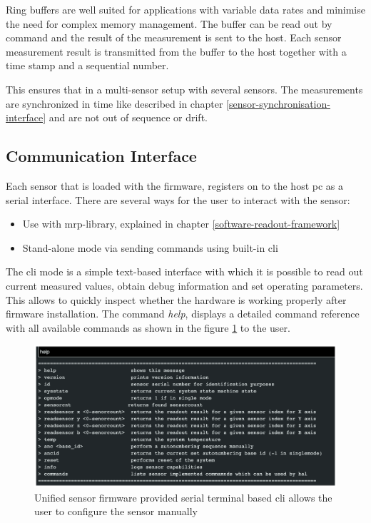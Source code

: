 Ring buffers are well suited for applications with variable data rates
and minimise the need for complex memory management. The buffer can be
read out by command and the result of the measurement is sent to the
host. Each sensor measurement result is transmitted from the buffer to
the host together with a time stamp and a sequential number.

This ensures that in a multi-sensor setup with several sensors. The
measurements are synchronized in time like described in chapter
\ref{sensor-synchronisation-interface} and are not out of sequence or
drift.

\hypertarget{communication-interface}{%
\subsection{Communication Interface}\label{communication-interface}}

Each sensor that is loaded with the firmware, registers on to the host
\gls{pc} as a serial interface. There are several ways for the user to
interact with the sensor:

\begin{itemize}
\tightlist
\item
  Use with \gls{mrp}-library, explained in chapter
  \ref{software-readout-framework}
\item
  Stand-alone mode via sending commands using built-in \gls{cli}
\end{itemize}

The \gls{cli} mode is a simple text-based interface with which it is
possible to read out current measured values, obtain debug information
and set operating parameters. This allows to quickly inspect whether the
hardware is working properly after firmware installation. The command
\emph{help}, displays a detailed command reference with all available
commands as shown in the figure
\ref{Unified_sensor_firmware_provided_serial_terminal_based_(+cli)_allows_the_user_to_configure_the_sensor_manually.png}
to the user.

\begin{figure}
\centering
\includegraphics{./generated_images/border_Unified_sensor_firmware_provided_serial_terminal_based_(+cli)_allows_the_user_to_configure_the_sensor_manually.png}
\caption{Unified sensor firmware provided serial terminal based
\gls{cli} allows the user to configure the sensor manually
\label{Unified_sensor_firmware_provided_serial_terminal_based_(+cli)_allows_the_user_to_configure_the_sensor_manually.png}}
\end{figure}

